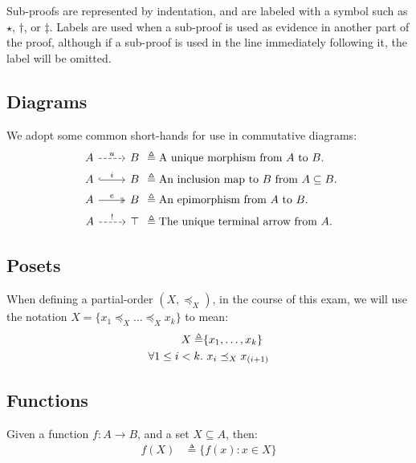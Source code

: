 Sub-proofs are represented by indentation, and are labeled with a symbol such as $\star$, $\dagger$, or $\ddagger$. Labels are used when a sub-proof is used as evidence in another part of the proof, although if a sub-proof is used in the line immediately following it, the label will be omitted.

\subsection{Diagrams}

We adopt some common short-hands for use in commutative diagrams:
\begin{align*}
  \begin{tikzcd}[ampersand replacement=\&]
    A \arrow[r, dashed, "u"] \& B
  \end{tikzcd}
   & \triangleq
  \text{A unique morphism from $A$ to $B$.}\\
  \begin{tikzcd}[ampersand replacement=\&]
    A \arrow[r, hook, "i"] \& B
  \end{tikzcd}
   & \triangleq
  \text{An inclusion map to $B$ from $A\subseteq B$.}\\
  \begin{tikzcd}[ampersand replacement=\&]
    A \arrow[r, two heads, "e"] \& B
  \end{tikzcd}
   & \triangleq
  \text{An epimorphism from $A$ to $B$.}\\
  \begin{tikzcd}[ampersand replacement=\&]
    A \arrow[r, dashed, "!"] \& \top
  \end{tikzcd}
   & \triangleq
  \text{The unique terminal arrow from $A$.}\\
\end{align*}

\subsection{Posets}

When defining a partial-order $(X,\preceq_X)$, in the course of this exam, we will use the notation $X = \{x_1\preceq_X\ldots\preceq_X x_k\}$ to mean:
\begin{align*}
  X \triangleq & \{x_1,\ldots,x_k\} \\
  \forall1\leq i < k \ldotp &~x_i\preceq_X x_{(i+1)}
\end{align*}

\subsection{Functions}

Given a function $f : A\to B$, and a set $X\subseteq A$, then:
\begin{align*}
  f(X) & \triangleq \{f(x) : x\in X\}
\end{align*}
